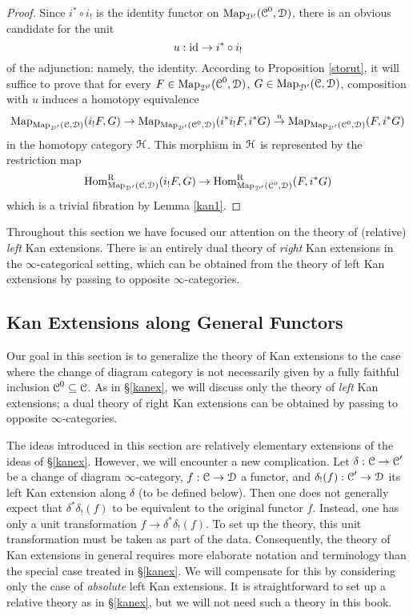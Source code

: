 \begin{proof}
Since $i^{\ast} \circ i_{!}$ is the identity functor on $\operatorname{{Map}}_{\operatorname{\mathcal{D}}'}(\operatorname{\mathcal{C}}^{0}, \operatorname{\mathcal{D}})$, there is an obvious candidate for the unit
$$ u: \operatorname{id} \rightarrow i^{\ast} \circ i_{!}$$
of the adjunction: namely, the identity. According to Proposition \ref{storut}, it will suffice to prove
that for every $F \in \operatorname{{Map}}_{\operatorname{\mathcal{D}}'}(\operatorname{\mathcal{C}}^{0}, \operatorname{\mathcal{D}})$,
$G \in \operatorname{{Map}}_{\operatorname{\mathcal{D}}'}(\operatorname{\mathcal{C}}, \operatorname{\mathcal{D}})$, composition with $u$ induces a homotopy equivalence
$$ \operatorname{{Map}}_{\operatorname{{Map}}_{\operatorname{\mathcal{D}}'}(\operatorname{\mathcal{C}},\operatorname{\mathcal{D}})
}(i_{!} F, G) \rightarrow \operatorname{{Map}}_{\operatorname{{Map}}_{\operatorname{\mathcal{D}}'}(\operatorname{\mathcal{C}}^{0},\operatorname{\mathcal{D}})}( i^{\ast} i_{!} F,
i^{\ast} G) \stackrel{u}{\rightarrow}\operatorname{{Map}}_{\operatorname{{Map}}_{\operatorname{\mathcal{D}}'}(\operatorname{\mathcal{C}}^{0},\operatorname{\mathcal{D}})}( F,
i^{\ast} G)$$
in the homotopy category $\operatorname{\mathcal{H}}$. This morphism in $\operatorname{\mathcal{H}}$ is represented by the restriction map 
$$ \operatorname{Hom}^{\operatorname{R}}_{ \operatorname{{Map}}_{\operatorname{\mathcal{D}}'}(\operatorname{\mathcal{C}},\operatorname{\mathcal{D}})}( i_{!}F,G) \rightarrow \operatorname{Hom}^{\operatorname{R}}_{\operatorname{{Map}}_{\operatorname{\mathcal{D}}'}(\operatorname{\mathcal{C}}^{0},\operatorname{\mathcal{D}})}(F, i^{\ast} G)$$
which is a trivial fibration by Lemma \ref{kan1}.
\end{proof}

\begin{remark}
Throughout this section we have focused our attention on the theory of (relative) {\em left} Kan extensions. There is an entirely dual theory of {\em right} Kan extensions in the $\infty$-categorical setting, which can be obtained from the theory of left Kan extensions by passing to opposite $\infty$-categories.
\end{remark}

\subsection{Kan Extensions along General Functors}\label{bigkanext}

Our goal in this section is to generalize the theory of Kan extensions to the case where the
change of diagram category is not necessarily given by a fully faithful inclusion 
$\operatorname{\mathcal{C}}^{0} \subseteq \operatorname{\mathcal{C}}$. As in \S \ref{kanex}, we will discuss only the theory of {\em left} Kan extensions; a dual theory of right Kan extensions can be obtained by passing to opposite $\infty$-categories.

The ideas introduced in this section are relatively elementary extensions of the ideas of \S \ref{kanex}. However, we will encounter a new complication.
Let $\delta: \operatorname{\mathcal{C}} \rightarrow \operatorname{\mathcal{C}}'$ be a change of diagram $\infty$-category,
$f: \operatorname{\mathcal{C}} \rightarrow \operatorname{\mathcal{D}}$ a functor, and $\delta_{!}(f): \operatorname{\mathcal{C}}' \rightarrow \operatorname{\mathcal{D}}$
its left Kan extension along $\delta$ (to be defined below). Then one does not generally
expect that $\delta^{\ast} \delta_{!}(f)$ to be equivalent to the original functor $f$. Instead, one
has only a unit transformation $f \rightarrow \delta^{\ast} \delta_{!}(f)$. To set up the theory, this unit transformation must be taken as part of the data. Consequently, the theory of Kan extensions in general requires more elaborate notation and terminology than the special case treated in \S \ref{kanex}. We will compensate for this by considering only the case of {\em absolute} left Kan extensions. It is straightforward to set up a relative theory as in \S \ref{kanex}, but we will not need such a theory in this book.

